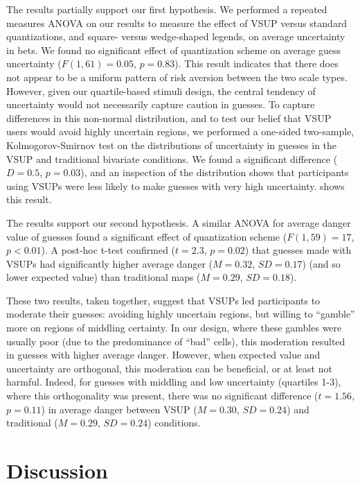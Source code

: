 The results partially support our first hypothesis. We performed a repeated measures ANOVA on our results to measure the effect of VSUP versus standard quantizations, and square- versus wedge-shaped legends, on average uncertainty in bets. We found no significant effect of quantization scheme on average guess uncertainty ($F(1,61)=0.05$, $p=0.83$). This result indicates that there does not appear to be a uniform pattern of risk aversion between the two scale types. However, given our quartile-based stimuli design, the central tendency of uncertainty would not necessarily capture caution in guesses. To capture differences in this non-normal distribution, and to test our belief that VSUP users would avoid highly uncertain regions, we performed a one-sided two-sample, Kolmogorov-Smirnov test on the distributions of uncertainty in guesses in the VSUP and traditional bivariate conditions. We found a significant difference ($D = 0.5$, $p=0.03$), and an inspection of the distribution shows that participants using VSUPs were less likely to make guesses with very high uncertainty.  shows this result.

The results support our second hypothesis. A similar ANOVA for average danger value of guesses found a significant effect of quantization scheme ($F(1,59)=17$, $p<0.01$). A post-hoc t-test confirmed ($t=2.3$, $p=0.02$) that guesses made with VSUPs had significantly higher average danger ($M=0.32$, $SD=0.17$) (and so lower expected value) than traditional maps ($M=0.29$, $SD=0.18$).

These two results, taken together, suggest that VSUPs led participants to moderate their guesses: avoiding highly uncertain regions, but willing to ``gamble'' more on regions of middling certainty. In our design, where these gambles were usually poor (due to the predominance of ``bad'' cells), this moderation resulted in guesses with higher average danger. However, when expected value and uncertainty are orthogonal, this moderation can be beneficial, or at least not harmful. Indeed, for guesses with middling and low uncertainty (quartiles 1-3), where this orthogonality was present, there was no significant difference ($t=1.56$, $p=0.11$) in average danger between VSUP ($M=0.30$, $SD=0.24$) and traditional ($M=0.29$, $SD=0.24$) conditions. 

\section{Discussion}

